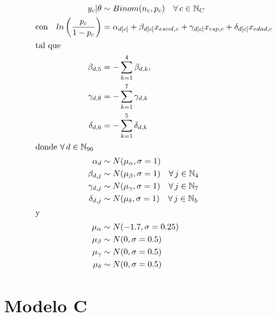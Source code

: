 \begin{align}\label{eq:Modelo_Comp_B}
y_c|\theta & \sim Binom(n_c,p_c) \quad \forall \, c \in \mathbb{N}_C \nonumber \\
\text{con} \quad ln\left(\dfrac{p_c}{1-p_c}\right) &= \alpha_{d[c]} + \beta_{d[c]} x_{escol,c} + \gamma_{d[c]} x_{csp,c} + \delta_{d[c]} x_{edad,c} \\ 
\intertext{tal que} 
\beta_{d,5} &= -\sum\limits_{k = 1}^{4} \beta_{d,k}, \nonumber \\
\gamma_{d,8} &= -\sum\limits_{k = 1}^{7} \gamma_{d,k} \nonumber \\
\delta_{d,6} &= -\sum\limits_{k = 1}^{5} \delta_{d,k} \nonumber \\
\intertext{donde $\forall \, d \in \mathbb{N}_{96}$}
\alpha_d & \sim N(\mu_{\alpha}, \sigma=1) \quad  \nonumber \\
\beta_{d,j} & \sim N(\mu_{\beta}, \sigma=1) \quad \forall \, j \in \mathbb{N}_{4} \nonumber \\
\gamma_{d,j} & \sim N(\mu_{\gamma}, \sigma=1) \quad \forall \, j \in \mathbb{N}_{7} \nonumber \\
\delta_{d,j} & \sim N(\mu_{\delta}, \sigma=1) \quad \forall \, j \in \mathbb{N}_{5} \nonumber \\
\intertext{y}
\mu_{\alpha} &\sim N(-1.7,\sigma=0.25) \nonumber \\
\mu_{\beta} &\sim N(0,\sigma=0.5) \nonumber \\
\mu_{\gamma} &\sim N(0,\sigma=0.5) \nonumber \\
\mu_{\delta} &\sim N(0,\sigma=0.5) \nonumber
\end{align}

\section*{Modelo C}

